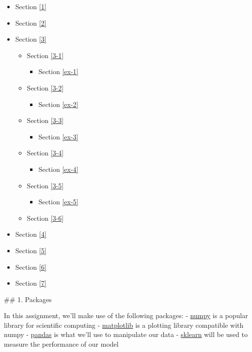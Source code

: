 \documentclass[11pt]{article}
\providecommand{\tightlist}{%
      \setlength{\itemsep}{0pt}\setlength{\parskip}{0pt}}
\begin{document}
\begin{itemize}
\tightlist
\item
  Section \ref{1}
\item
  Section \ref{2}
\item
  Section \ref{3}

  \begin{itemize}
  \tightlist
  \item
    Section \ref{3-1}

    \begin{itemize}
    \tightlist
    \item
      Section \ref{ex-1}
    \end{itemize}
  \item
    Section \ref{3-2}

    \begin{itemize}
    \tightlist
    \item
      Section \ref{ex-2}
    \end{itemize}
  \item
    Section \ref{3-3}

    \begin{itemize}
    \tightlist
    \item
      Section \ref{ex-3}
    \end{itemize}
  \item
    Section \ref{3-4}

    \begin{itemize}
    \tightlist
    \item
      Section \ref{ex-4}
    \end{itemize}
  \item
    Section \ref{3-5}

    \begin{itemize}
    \tightlist
    \item
      Section \ref{ex-5}
    \end{itemize}
  \item
    Section \ref{3-6}
  \end{itemize}
\item
  Section \ref{4}
\item
  Section \ref{5}
\item
  Section \ref{6}
\item
  Section \ref{7}
\end{itemize}

     \#\# 1. Packages

In this assignment, we'll make use of the following packages: -
\href{https://docs.scipy.org/doc/numpy/}{numpy} is a popular library for
scientific computing -
\href{https://matplotlib.org/3.1.1/contents.html}{matplotlib} is a
plotting library compatible with numpy -
\href{https://pandas.pydata.org/docs/}{pandas} is what we'll use to
manipulate our data -
\href{https://scikit-learn.org/stable/index.html}{sklearn} will be used
to measure the performance of our model
\end{document}
